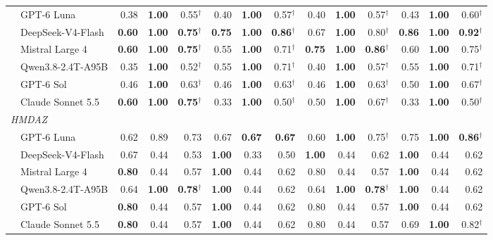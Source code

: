 \begin{table}[t]
\begin{tabular}{l@{\hspace{0.6em}}rrr@{\hspace{0.6em}}rrr@{\hspace{0.6em}}rrr@{\hspace{0.6em}}rrr}
  ~~GPT-6 Luna & 0.38 & \textbf{1.00} & 0.55$^\dagger$ & 0.40 & \textbf{1.00} & 0.57$^\dagger$ & 0.40 & \textbf{1.00} & 0.57$^\dagger$ & 0.43 & \textbf{1.00} & 0.60$^\dagger$ \\
  ~~DeepSeek-V4-Flash & \textbf{0.60} & \textbf{1.00} & \textbf{0.75}$^\dagger$ & \textbf{0.75} & \textbf{1.00} & \textbf{0.86}$^\dagger$ & 0.67 & \textbf{1.00} & 0.80$^\dagger$ & \textbf{0.86} & \textbf{1.00} & \textbf{0.92}$^\dagger$ \\
  ~~Mistral Large 4 & \textbf{0.60} & \textbf{1.00} & \textbf{0.75}$^\dagger$ & 0.55 & \textbf{1.00} & 0.71$^\dagger$ & \textbf{0.75} & \textbf{1.00} & \textbf{0.86}$^\dagger$ & 0.60 & \textbf{1.00} & 0.75$^\dagger$ \\
  ~~Qwen3.8-2.4T-A95B & 0.35 & \textbf{1.00} & 0.52$^\dagger$ & 0.55 & \textbf{1.00} & 0.71$^\dagger$ & 0.40 & \textbf{1.00} & 0.57$^\dagger$ & 0.55 & \textbf{1.00} & 0.71$^\dagger$ \\
  ~~GPT-6 Sol & 0.46 & \textbf{1.00} & 0.63$^\dagger$ & 0.46 & \textbf{1.00} & 0.63$^\dagger$ & 0.46 & \textbf{1.00} & 0.63$^\dagger$ & 0.50 & \textbf{1.00} & 0.67$^\dagger$ \\
  ~~Claude Sonnet 5.5 & \textbf{0.60} & \textbf{1.00} & \textbf{0.75}$^\dagger$ & 0.33 & \textbf{1.00} & 0.50$^\dagger$ & 0.50 & \textbf{1.00} & 0.67$^\dagger$ & 0.33 & \textbf{1.00} & 0.50$^\dagger$ \\
  \midrule
  \multicolumn{13}{l}{\textit{HMDAZ}} \\
  ~~GPT-6 Luna & 0.62 & 0.89 & 0.73 & 0.67 & \textbf{0.67} & \textbf{0.67} & 0.60 & \textbf{1.00} & 0.75$^\dagger$ & 0.75 & \textbf{1.00} & \textbf{0.86}$^\dagger$ \\
  ~~DeepSeek-V4-Flash & 0.67 & 0.44 & 0.53 & \textbf{1.00} & 0.33 & 0.50 & \textbf{1.00} & 0.44 & 0.62 & \textbf{1.00} & 0.44 & 0.62 \\
  ~~Mistral Large 4 & \textbf{0.80} & 0.44 & 0.57 & \textbf{1.00} & 0.44 & 0.62 & 0.80 & 0.44 & 0.57 & \textbf{1.00} & 0.44 & 0.62 \\
  ~~Qwen3.8-2.4T-A95B & 0.64 & \textbf{1.00} & \textbf{0.78}$^\dagger$ & \textbf{1.00} & 0.44 & 0.62 & 0.64 & \textbf{1.00} & \textbf{0.78}$^\dagger$ & \textbf{1.00} & 0.44 & 0.62 \\
  ~~GPT-6 Sol & \textbf{0.80} & 0.44 & 0.57 & \textbf{1.00} & 0.44 & 0.62 & 0.80 & 0.44 & 0.57 & \textbf{1.00} & 0.44 & 0.62 \\
  ~~Claude Sonnet 5.5 & \textbf{0.80} & 0.44 & 0.57 & \textbf{1.00} & 0.44 & 0.62 & 0.80 & 0.44 & 0.57 & 0.69 & \textbf{1.00} & 0.82$^\dagger$ \\

\end{tabular}
\end{table}
